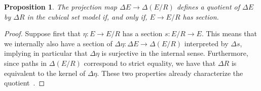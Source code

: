 \documentclass[10pt,a4paper]{article}
\newtheorem{proposition}{Proposition}[section]
\begin{document}

\begin{proposition}\label{prop:strict-quotient-is-homotopy-quotient-iff-projection-splits}
  The projection map $\Delta E \rightarrow \Delta (E/R)$ defines a quotient of $\Delta E$ by $\Delta R$ in the cubical set model if, and only if, $E\rightarrow E/R$ has section.
\end{proposition}
\begin{proof}
  Suppose first that $\eta \colon E \to E/R$ has a section $s \colon E/R \to E$.
  This means that we internally also have a section of $\Delta\eta \colon \Delta E \to \Delta(E/R)$ interpreted by $\Delta s$, implying in particular that $\Delta \eta$ is surjective in the internal sense.
  Furthermore, since paths in $\Delta (E/R)$ correspond to strict equality, we have that $\Delta R$ is equivalent to the kernel of $\Delta\eta$.
  These two properties already characterize the quotient~\cite[Theorem~18.2.3]{rijke2025intro}.


\end{proof}
\end{document}
